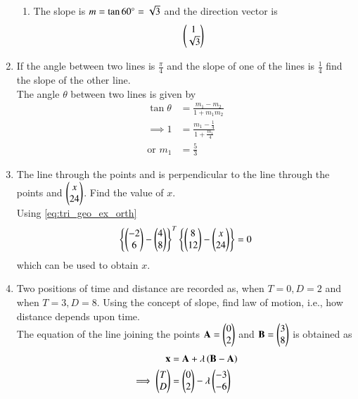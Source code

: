 \begin{enumerate}[label=\arabic*.,ref=\thesubsection.\theenumi]
\begin{enumerate}
%
\item The slope is $m = \tan 60 \degree = \sqrt{3}$ and the  direction vector is
\begin{align}
\begin{pmatrix}1\\\sqrt{3}\end{pmatrix}
\end{align}
\end{enumerate}
\item If the angle between two lines is $\frac{\pi}{4}$ and the slope of one of the lines is $\frac{1}{4}$ find the slope of the other line.
\\
\solution The angle $\theta$ between two lines is given by 
%
\begin{align}
\tan \theta &= \frac{m_1-m_2}{1+m_1m_2}
\\
\implies 1 &= \frac{m_1-\frac{1}{4}}{1+\frac{m_1}{4}}
\\
\text{or } m_1 &= \frac{5}{3} 
\end{align}
%
\item The line through the points  and  is perpendicular to the line through the points  and $\begin{pmatrix}x\\24\end{pmatrix}$.  Find the value of $x$.
%
\\
\solution Using \eqref{eq:tri_geo_ex_orth}
\begin{align}
\left\{\begin{pmatrix}-2\\ 6\end{pmatrix}-\begin{pmatrix}4\\8\end{pmatrix}\right\}^T \left\{\begin{pmatrix}8\\ 12\end{pmatrix}-\begin{pmatrix}x\\24\end{pmatrix}\right\}=  0 
\end{align}
%
which can be used to obtain $x$.
\item Two positions of time and distance are recorded as, when $T = 0, D = 2$ and when $T = 3, D = 8$. Using the concept of slope, find law of motion, i.e., how distance depends upon time.
%
\\
\solution The equation of the line joining the points $\mathbf{A}=\begin{pmatrix}0\\2\end{pmatrix}$ and $\mathbf{B}=\begin{pmatrix}3\\8\end{pmatrix}$ is obtained as
%
\begin{align}
\label{eq:line_two_pt}
\vec{x} &= \vec{A}+\lambda\brak{\vec{B}-\vec{A}}
\\
\implies \myvec{T\\D} &= \myvec{0\\2}-\lambda\myvec{-3\\-6}

\end{align}
\end{enumerate}
